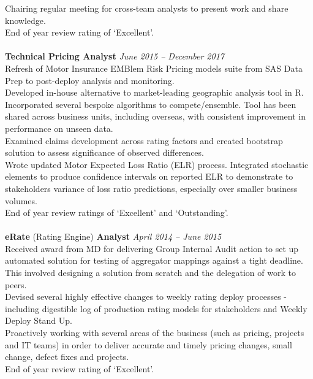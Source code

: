 \documentclass[11pt]{article}
\begin{document}
\begin{description}
\textbullet \quad Chairing regular meeting for cross-team analysts to present work and share knowledge. \\
\textbullet \quad End of year review rating of `Excellent'.
\\\\
\textbf{Technical Pricing Analyst} \emph{June 2015 -- December 2017}\\
\textbullet \quad Refresh of Motor Insurance EMBlem Risk Pricing models suite from SAS Data Prep to post-deploy analysis and monitoring. \\
\textbullet \quad Developed in-house alternative to market-leading geographic analysis tool in R. Incorporated several bespoke algorithms to compete/ensemble. Tool has been shared across business units, including overseas, with consistent improvement in performance on unseen data. \\
\textbullet \quad Examined claims development across rating factors and created bootstrap solution to assess significance of observed differences. \\
\textbullet \quad Wrote updated Motor Expected Loss Ratio (ELR) process. Integrated stochastic elements to produce confidence intervals on reported ELR to demonstrate to stakeholders variance of loss ratio predictions, especially over smaller business volumes. \\
\textbullet \quad End of year review ratings of `Excellent' and `Outstanding'.
\\\\
\newpage
\textbf{eRate} (Rating Engine) \textbf{Analyst} \emph{April 2014 -- June 2015}\\
\textbullet \quad Received award from MD for delivering Group Internal Audit action to set up automated solution for testing of aggregator mappings against a tight deadline. This involved designing a solution from scratch and the delegation of work to peers.\\
\textbullet \quad Devised several highly effective changes to weekly rating deploy processes - including digestible log of production rating models for stakeholders and Weekly Deploy Stand Up. \\
\textbullet \quad Proactively working with several areas of the business (such as pricing, projects and IT teams) in order to deliver accurate and timely pricing changes, small change, defect fixes and projects.\\
\textbullet \quad End of year review rating of `Excellent'.
\end{description}
\end{document}
